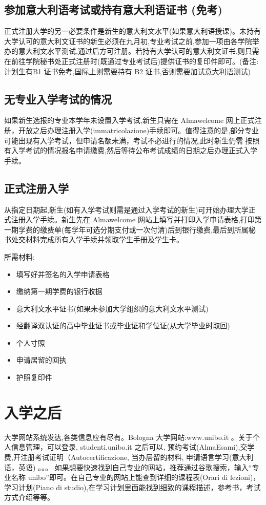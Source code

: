 \subsection{参加意大利语考试或持有意大利语证书 (免考)}
正式注册大学的另一必要条件是新生的意大利文水平(如果意大利语授课)。未持有大学认可的意大利文证书的新生必须在九月初,专业考试之前,参加一项由各学院举办的意大利文水平测试,通过后方可注册。若持有大学认可的意大利文证书,则只需在前往学院秘书处正式注册时(既通过专业考试后)提供证书的复印件即可。(备注:计划生有B1 证书免考,国际上则需要持有 B2 证书,否则需要加试意大利语测试) 




\subsection{无专业入学考试的情况}
如果新生选报的专业本学年未设置入学考试,新生只需在 Almawelcome 网上正式注册，开放之后办理注册入学(immatricolazione)手续即可。值得注意的是,部分专业可能出现有入学考试，但申请名额未满，考试不必进行的情况,此时新生仍需 按照有入学考试的情况报名申请缴费,然后等待公布考试成绩的日期之后办理正式入学手续。 
\subsection{正式注册入学}
从指定日期起,新生(如有入学考试则需是通过入学考试的新生)可开始办理大学正式注册入学手续。新生先在 Almawelcome 网站上填写并打印入学申请表格,打印第一期学费的缴费单(每学年可选分期支付或一次付清)后到银行缴费,最后到所属秘书处交材料完成所有入学手续并领取学生手册及学生卡。 

所需材料:
\begin{itemize}
\item 填写好并签名的入学申请表格 
\item 缴纳第一期学费的银行收据 
\item 意大利文水平证书(如果未参加大学组织的意大利文水平测试) 
\item 经翻译双认证的高中毕业证书或毕业证和学位证(从大学毕业时取回)
\item 个人寸照
\item 申请居留的回执
\item 护照复印件 
\end{itemize}




\section{入学之后}
大学网站系统发达,各类信息应有尽有。Bologna 大学网站:www.unibo.it 。关于个人信息管理，可以登录, studenti.unibo.it 之后可以, 预约考试(AlmaEsami),交学费,开注册考试证明（Autocertificazione, 当办居留的材料, 申请语言学习(意大利语，英语) 。。。
如果想要快速找到自己专业的网站，推荐通过谷歌搜索，输入“专业名称 unibo”即可。在自己专业的网站上能查到详细的课程表(Orari di lezioni)，学习计划(Piano di studio),在学习计划里面能找到细致的课程描述，参考书，考试方式介绍等等。

